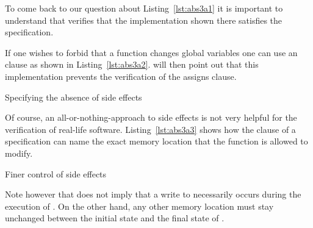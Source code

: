 To come back to our question about Listing~\ref{lst:abs3a1} it is important
to understand that \framacwp verifies that the implementation shown there
satisfies the specification.

If one wishes to forbid that a function changes global variables
one can use an  clause as shown in Listing~\ref{lst:abs3a2}.
\framacwp will then point out that this implementation prevents
the verification of the assigns clause.

\begin{listing}[hbt]
\begin{minipage}{\textwidth}

\end{minipage}
\caption{\label{lst:abs3a2} Specifying the absence of side effects}
\end{listing}


\FloatBarrier

Of course, an all-or-nothing-approach to side effects is not very helpful
for the verification of real-life software.
Listing~\ref{lst:abs3a3} shows how the  clause of a
specification can name the exact memory location that the
function is allowed to modify.

\begin{listing}[hbt]
\begin{minipage}{\textwidth}

\end{minipage}
\caption{\label{lst:abs3a3} Finer control of side effects}
\end{listing}

Note however that  does not imply that a write to 
necessarily occurs during the execution of . On the other hand, any
other memory location must stay unchanged between the initial state
and the final state of .

